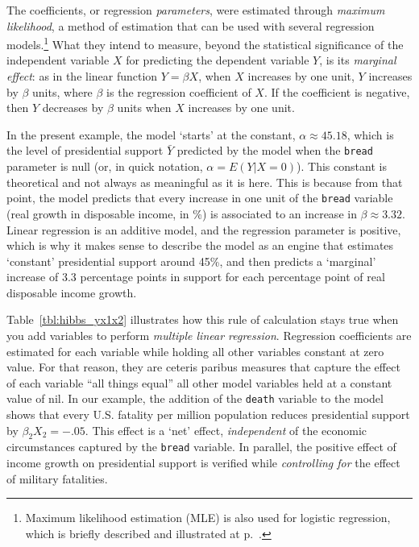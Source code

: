 	The coefficients, or regression \emph{parameters}, were estimated through \emph{maximum likelihood}, a method of estimation that can be used with several regression models.\footnote{Maximum likelihood estimation (MLE) is also used for logistic regression, which is briefly described and illustrated at p.~\pageref{ch:log}.} What they intend to measure, beyond the statistical significance of the independent variable $X$ for predicting the dependent variable $Y$, is its \emph{marginal effect}: as in the linear function $Y=\beta X$, when $X$ increases by one unit, $Y$ increases by $\beta$ units, where $\beta$ is the regression coefficient of $X$. If the coefficient is negative, then $Y$ decreases by $\beta$ units when $X$ increases by one unit.

	In the present example, the model `starts' at the constant, $\alpha \approx 45.18$, which is the level of presidential support $\bar Y$ predicted by the model when the \texttt{bread} parameter is null (or, in quick notation, $\alpha = E(Y|X=0)$). This constant is theoretical and not always as meaningful as it is here. This is because from that point, the model predicts that every increase in one unit of the \texttt{bread} variable (real growth in disposable income, in \%) is associated to an increase in $\beta \approx 3.32$. Linear regression is an additive model, and the regression parameter is positive, which is why it makes sense to describe the model as an engine that estimates `constant' presidential support around 45\%, and then predicts a `marginal' increase of 3.3 percentage points in support for each percentage point of real disposable income growth.
	
	Table~\ref{tbl:hibbs_yx1x2} illustrates how this rule of calculation stays true when you add variables to perform \emph{multiple linear regression}. Regression coefficients are estimated for each variable while holding all other variables constant at zero value. For that reason, they are ceteris paribus measures that capture the effect of each variable ``all things equal'' \ie all other model variables held at a constant value of nil. In our example, the addition of the \texttt{death} variable to the model shows that every U.S. fatality per million population reduces presidential support by $\beta_2 X_2=-.05$. This effect is a `net' effect, \emph{independent} of the economic circumstances captured by the \texttt{bread} variable. In parallel, the positive effect of income growth on presidential support is verified while \emph{controlling for} the effect of military fatalities.

